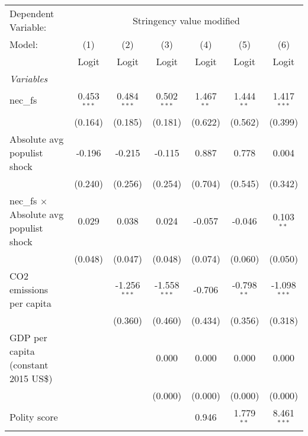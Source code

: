 
\begingroup
\centering
\begin{tabular}{lcccccc}
   \toprule
   Dependent Variable: & \multicolumn{6}{c}{Stringency value modified}\\
   Model:                                         & (1)           & (2)            & (3)            & (4)          & (5)           & (6)\\  
                                                  &  Logit        & Logit          & Logit          & Logit        & Logit         & Logit\\  
   \midrule
   \emph{Variables}\\
   nec\_fs                                        & 0.453$^{***}$ & 0.484$^{***}$  & 0.502$^{***}$  & 1.467$^{**}$ & 1.444$^{**}$  & 1.417$^{***}$\\   
                                                  & (0.164)       & (0.185)        & (0.181)        & (0.622)      & (0.562)       & (0.399)\\   
   Absolute avg populist shock                    & -0.196        & -0.215         & -0.115         & 0.887        & 0.778         & 0.004\\   
                                                  & (0.240)       & (0.256)        & (0.254)        & (0.704)      & (0.545)       & (0.342)\\   
   nec\_fs $\times$ Absolute avg populist shock   & 0.029         & 0.038          & 0.024          & -0.057       & -0.046        & 0.103$^{**}$\\   
                                                  & (0.048)       & (0.047)        & (0.048)        & (0.074)      & (0.060)       & (0.050)\\   
   CO2 emissions per capita                       &               & -1.256$^{***}$ & -1.558$^{***}$ & -0.706       & -0.798$^{**}$ & -1.098$^{***}$\\   
                                                  &               & (0.360)        & (0.460)        & (0.434)      & (0.356)       & (0.318)\\   
   GDP per capita (constant 2015 US\$)            &               &                & 0.000          & 0.000        & 0.000         & 0.000\\   
                                                  &               &                & (0.000)        & (0.000)      & (0.000)       & (0.000)\\   
   Polity score                                   &               &                &                & 0.946        & 1.779$^{**}$  & 8.461$^{***}$\\   

\end{tabular}
